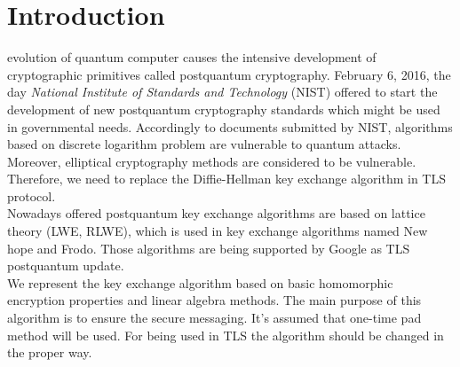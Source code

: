 \section{Introduction}
	\IEEEoverridecommandlockouts{} evolution of quantum computer causes the intensive development of cryptographic primitives called postquantum cryptography. February 6, 2016, the day \textit{National Institute of Standards and Technology} (NIST) offered to start the development of new postquantum cryptography standards which might be used in governmental needs. Accordingly to documents submitted by NIST, algorithms based on discrete logarithm problem are vulnerable to quantum attacks. Moreover, elliptical cryptography methods are considered to be vulnerable. Therefore, we need to replace the Diffie-Hellman key exchange algorithm in TLS protocol. \\ 
Nowadays offered postquantum key exchange algorithms are based on lattice theory (LWE, RLWE), which is used in key exchange algorithms named New hope and Frodo. Those algorithms are being supported by Google as TLS postquantum update. \\
We represent the key exchange algorithm based on basic homomorphic encryption properties and linear algebra methods. The main purpose of this algorithm is to ensure the secure messaging. It's assumed that one-time pad method will be used. For being used in TLS the algorithm should be changed in the proper way. 